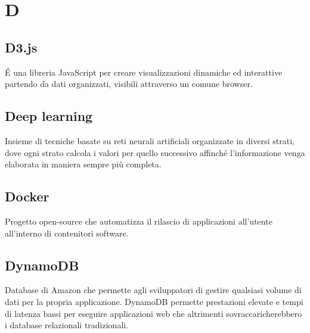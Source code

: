 \section*{D}
\markright{}
\subsection*{D3.js}
\'E una libreria JavaScript per creare visualizzazioni dinamiche ed interattive partendo da dati organizzati, visibili attraverso un comune browser.
\subsection*{Deep learning}
Insieme di tecniche basate su reti neurali artificiali organizzate in diversi strati, dove ogni strato calcola i valori per quello successivo affinché l'informazione venga elaborata in maniera sempre più completa.
\subsection*{Docker}
Progetto open-source che automatizza il rilascio di applicazioni all'utente all'interno di contenitori software.
\subsection*{DynamoDB}
Database  di Amazon che permette agli sviluppatori di gestire qualsiasi volume di dati per la propria applicazione. DynamoDB permette prestazioni elevate e tempi di latenza bassi per eseguire applicazioni web che altrimenti sovraccaricherebbero i database relazionali tradizionali.
